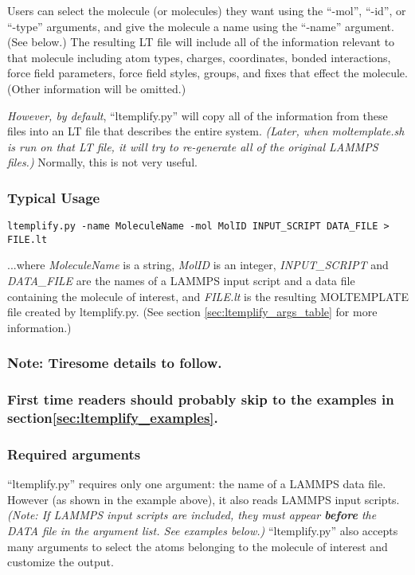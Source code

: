 \documentclass[11pt]{article}
\begin{document}
Users can select the molecule (or molecules) they want
using the ``-mol'', ``-id'', or ``-type'' arguments,
and give the molecule a name using the ``-name'' argument.  (See below.)
The resulting LT file will include all of the information relevant
to that molecule including atom types, charges, coordinates,
bonded interactions, force field parameters, force field styles,
groups, and fixes that effect the molecule.
(Other information will be omitted.)

\textit{However, by default}, ``ltemplify.py'' will copy all of the information
from these files into an LT file that
describes the entire system.
\textit{(Later, when moltemplate.sh is run on that LT file,
  it will try to re-generate all of the original LAMMPS files.)}
Normally, this is not very useful.


\subsubsection*{Typical Usage}
\begin{verbatim}
ltemplify.py -name MoleculeName -mol MolID INPUT_SCRIPT DATA_FILE > FILE.lt
\end{verbatim}
...where \textit{MoleculeName} is a string,
\textit{MolID} is an integer,
\textit{INPUT\_SCRIPT} and \textit{DATA\_FILE}
are the names of a LAMMPS input script and a data file
containing the molecule of interest,
and \textit{FILE.lt} is the resulting
MOLTEMPLATE file created by ltemplify.py.
(See section \ref{sec:ltemplify_args_table} for more information.)

\subsubsection*{Note: Tiresome details to follow.}
\subsubsection*{First time readers should probably skip to
the examples in section\ref{sec:ltemplify_examples}.}

\subsubsection*{Required arguments}

``ltemplify.py'' requires only one argument: the name of a LAMMPS data file.
However (as shown in the example above), it also reads LAMMPS input scripts.
\textit{(Note: If LAMMPS input scripts are included, they must appear
\textbf{before} the DATA file in the argument list.  See examples below.)}
``ltemplify.py'' also accepts many arguments to select the atoms belonging
to the molecule of interest and customize the output.
\end{document}
